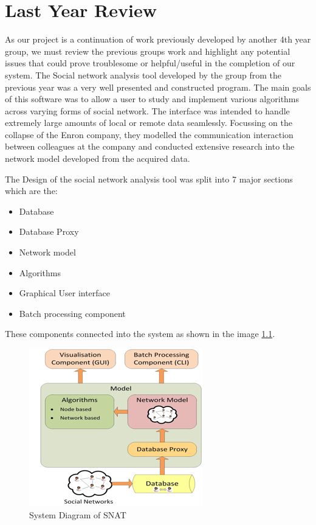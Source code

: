 \chapter{Last Year Review}

As our project is a continuation of work previously developed by another 4th year group, we must review the previous groups work and highlight any potential issues that could prove troublesome or helpful/useful in the completion of our system. The Social network analysis tool developed by the group from the previous year was a very well presented and constructed program. The main goals of this software was to allow a user to study and implement various algorithms across varying forms of social network. The interface was intended to handle extremely large amounts of local or remote data seamlessly. Focussing on the collapse of the Enron company, they modelled the communication interaction between colleagues at the company and conducted extensive research into the network model developed from the acquired data. 

The Design of the social network analysis tool was split into 7 major sections which are the:

\begin{itemize}
\item Database
\item Database Proxy
\item Network model
\item Algorithms
\item Graphical User interface
\item Batch processing component
\end{itemize}

These components connected into the system as shown in the image \ref{fig:previous-review-system-diagram}.

\begin{figure}[htbp]
	\centering
	\includegraphics[width=0.4\linewidth]{img/previous_review_system_diagram.png}
	\caption{System Diagram of SNAT}
	\label{fig:previous-review-system-diagram}
\end{figure}

